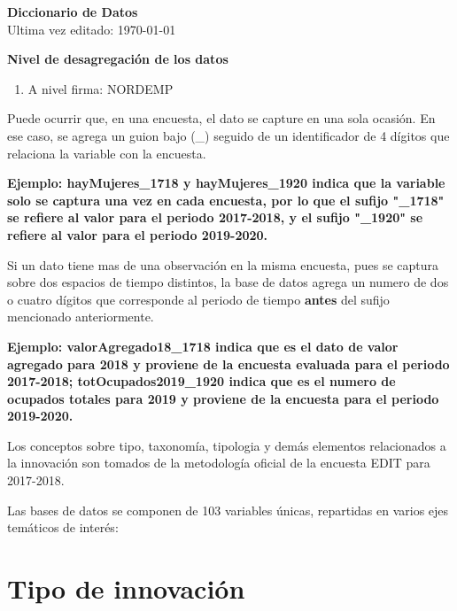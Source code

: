 \documentclass[12pt,a4paper]{article}
\begin{document}
\begin{center}
	\textbf{Diccionario de Datos} \\
	Ultima vez editado: \today
\end{center}
\vspace{10mm}

\textbf{Nivel de desagregación de los datos}
\begin{enumerate}
	\item A nivel firma: NORDEMP
\end{enumerate}

Puede ocurrir que, en una encuesta, el dato se capture en una sola ocasión. En ese caso, se agrega un guion bajo (\_) seguido de un identificador de 4 dígitos que relaciona la variable con la encuesta.

\begin{center}
	\textbf{\textbf{Ejemplo}: hayMujeres\_1718 y hayMujeres\_1920 indica que la variable solo se captura una vez en cada encuesta, por lo que el sufijo "\_1718" se refiere al valor para el periodo 2017-2018, y el sufijo "\_1920" se refiere al valor para el periodo 2019-2020.}
\end{center}

Si un dato tiene mas de una observación en la misma encuesta, pues se captura sobre dos espacios de tiempo distintos, la base de datos agrega un numero de dos o cuatro dígitos que corresponde al periodo de tiempo \textbf{antes} del sufijo mencionado anteriormente. 

\begin{center}
	\textbf{\textbf{Ejemplo}: valorAgregado18\_1718 indica que es el dato de valor agregado para 2018 y proviene de la encuesta evaluada para el periodo 2017-2018; totOcupados2019\_1920 indica que es el numero de ocupados totales para 2019 y proviene de la encuesta para el periodo 2019-2020.}
\end{center}




Los conceptos sobre tipo, taxonomía, tipologia y demás elementos relacionados a la innovación son tomados de la metodología oficial de la encuesta EDIT para 2017-2018.

Las bases de datos se componen de 103 variables únicas, repartidas en varios ejes temáticos de interés:

\section{Tipo de innovación}
\end{document}
